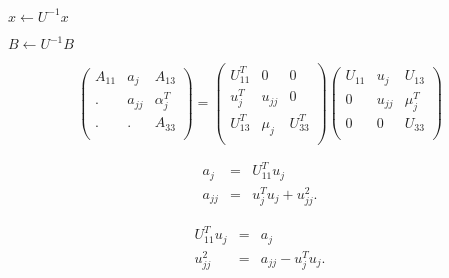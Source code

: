 {\newpage\clearpage
{}%
$x \leftarrow U^{-1} x$%
\lthtmlinlinemathZ
\lthtmlcheckvsize\clearpage}

{\newpage\clearpage
{}%
$B \leftarrow U^{-1} B$%
\lthtmlinlinemathZ
\lthtmlcheckvsize\clearpage}

{\newpage\clearpage
{}%
\begin{displaymath}
\left( \begin{array}{ccc}
A_{11}   & a_j     & A_{13}       \\
.        & a_{jj}  & \alpha_{j}^T \\
.        & .       & A_{33}       \\
\end{array} \right) =
\left( \begin{array}{ccc}
U_{11}^T & 0       & 0            \\
u_{j}^T  & u_{jj}  & 0            \\
U_{13}^T & \mu_j   & U_{33}^T     \\
\end{array} \right)
\left( \begin{array}{ccc}
U_{11}   & u_j     & U_{13}       \\
0        & u_{jj}  & \mu_{j}^T    \\
0        & 0       & U_{33}   \\
\end{array} \right)
\end{displaymath}%
\lthtmldisplayZ
\lthtmlcheckvsize\clearpage}

{\newpage\clearpage
{}%
\begin{eqnarray*}
a_j    & = & U_{11}^T u_j \\
a_{jj} & = & u_{j}^T u_j + u_{jj}^2.
\end{eqnarray*}%
\lthtmldisplayZ
\lthtmlcheckvsize\clearpage}

{\newpage\clearpage
{}%
\begin{eqnarray*}
U_{11}^T u_j & = & a_j \\
u_{jj}^2     & = & a_{jj} - u_{j}^T u_j.
\end{eqnarray*}%
\lthtmldisplayZ
\lthtmlcheckvsize\clearpage}

